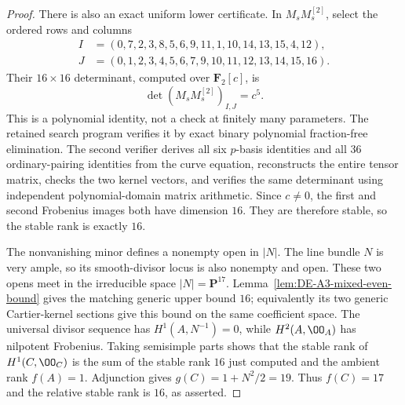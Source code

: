 \begin{proof}
There is also an exact uniform lower certificate.
In $M_sM_s^{[2]}$, select the ordered rows and columns
\begin{align*}
 I&=(0,7,2,3,8,5,6,9,11,1,10,14,13,15,4,12),\\
 J&=(0,1,2,3,4,5,6,7,9,10,11,12,13,14,15,16).
\end{align*}
Their $16\times16$ determinant, computed over $\mathbf F_2[c]$, is
\[
                  \det (M_sM_s^{[2]})_{I,J}=c^5.
\]
This is a polynomial identity, not a check at finitely many
parameters. The retained search program verifies it by exact binary
polynomial fraction-free elimination. The second verifier derives
all six $p$-basis identities and all $36$ ordinary-pairing identities
from the curve equation, reconstructs the entire tensor matrix,
checks the two kernel vectors, and verifies the same determinant
using independent polynomial-domain matrix arithmetic.
Since $c\ne0$, the first and second Frobenius images both have
dimension $16$. They are therefore stable, so the stable rank is
exactly $16$.

The nonvanishing minor defines a nonempty open in $|N|$.
The line bundle $N$ is very ample, so its smooth-divisor locus is
also nonempty and open. These two opens meet in the irreducible
space $|N|=\mathbf P^{17}$.
Lemma~\ref{lem:DE-A3-mixed-even-bound} gives the matching generic
upper bound $16$; equivalently its two generic Cartier-kernel
sections give this bound on the same coefficient space.
The universal divisor sequence has $H^1(A,N^{-1})=0$, while
$H^2(A,\OO_A)$ has nilpotent Frobenius. Taking semisimple parts
shows that the stable rank of $H^1(C,\OO_C)$ is the sum of the
stable rank $16$ just computed and the ambient rank
$f(A)=1$. Adjunction gives $g(C)=1+N^2/2=19$.
Thus $f(C)=17$ and the relative stable rank is $16$, as asserted.
\end{proof}

